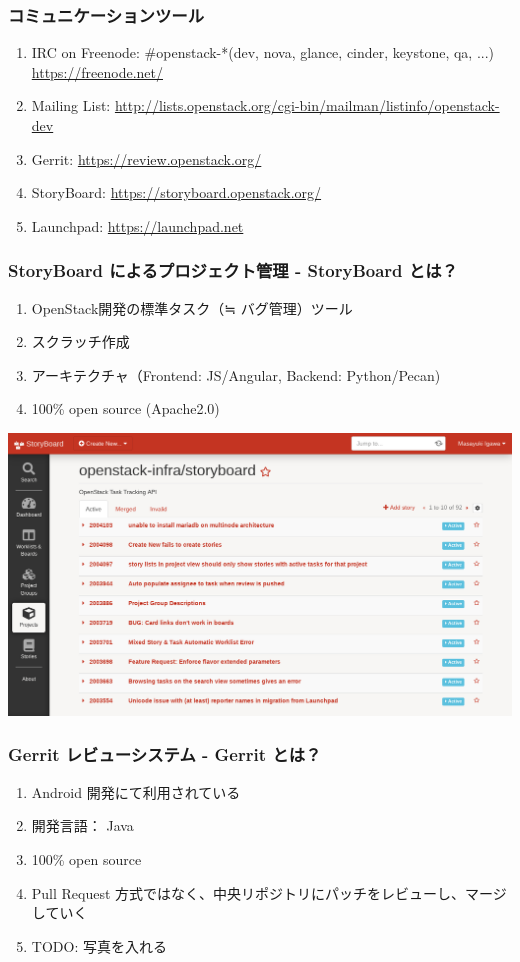 \documentclass[aspectratio=169,11pt,hyperref={colorlinks=true}]{beamer}
\begin{document}
\begin{frame}
  \frametitle{コミュニケーションツール}
  \begin{enumerate}
    \item IRC on Freenode: \#openstack-*(dev, nova, glance, cinder, keystone, qa, ...) \url{https://freenode.net/}
    \item Mailing List: \url{http://lists.openstack.org/cgi-bin/mailman/listinfo/openstack-dev}
    \item Gerrit: \url{https://review.openstack.org/}
    \item StoryBoard: \url{https://storyboard.openstack.org/}
    \item Launchpad: \url{https://launchpad.net}
  \end{enumerate}
\end{frame}

\begin{frame}
  \frametitle{StoryBoard によるプロジェクト管理 - StoryBoard とは？}
  \begin{enumerate}
    \item OpenStack開発の標準タスク（≒ バグ管理）ツール
    \item スクラッチ作成
    \item アーキテクチャ（Frontend: JS/Angular, Backend: Python/Pecan)
    \item 100\% open source (Apache2.0)
  \end{enumerate}
  \centering\includegraphics[scale=0.2]{storyboard.png}
\end{frame}

\begin{frame}
  \frametitle{Gerrit レビューシステム - Gerrit とは？}
  \begin{enumerate}
    \item Android 開発にて利用されている
    \item 開発言語： Java
    \item 100\% open source
    \item Pull Request 方式ではなく、中央リポジトリにパッチをレビューし、マージしていく
    \item TODO: 写真を入れる
  \end{enumerate}
\end{frame}
\end{document}
